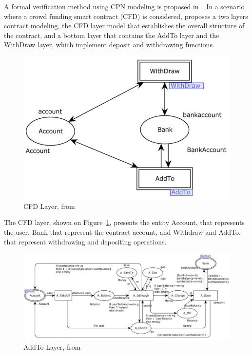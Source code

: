 \documentclass[sigconf, nonacm]{acmart}
\begin{document}
A formal verification method using CPN modeling is proposed in~\cite{Liu2019}. In a scenario where a crowd funding smart contract (CFD) is considered, \cite{Liu2019} proposes a two layers contract modeling, 
the CFD layer model that establishes the overall structure of the contract, and a bottom layer that contains the AddTo layer
and the WithDraw layer, which implement deposit and withdrawing functions.
\begin{figure}[h]
  \centering
  \includegraphics[width=\linewidth]{cfd-layer}
  \caption{CFD Layer, from \cite{Liu2019}}
  \label{fig:cfd-layer}
\end{figure}

The CFD layer, shown on Figure~\ref{fig:cfd-layer}, presents the entity Account, that represents the user, Bank that represent
the contract account, and Withdraw and AddTo, that represent withdrawing and depositing operations.

\begin{figure}[h]
  \centering
  \includegraphics[width=\linewidth]{add-to-layer}
  \caption{AddTo Layer, from \cite{Liu2019}}
  \label{fig:add-to-layer}
\end{figure}
\end{document}
